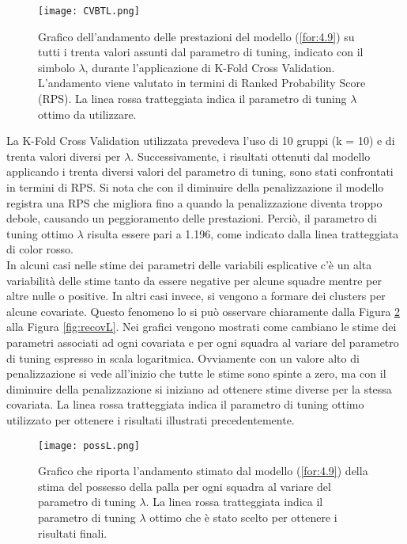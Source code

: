 \begin{figure}[htbp]
	\begin{center}
		\texttt{[image: CVBTL.png]}
		\caption{Grafico dell'andamento delle prestazioni del modello (\ref{for:4.9}) su tutti i trenta valori assunti dal parametro di tuning, indicato con il simbolo $\lambda$, durante l'applicazione di K-Fold Cross Validation. L'andamento viene valutato in termini di Ranked Probability Score (RPS). La linea rossa tratteggiata indica il parametro di tuning $\lambda$ ottimo da utilizzare.} \label{fig:lambda1}
	\end{center}
\end{figure}
La K-Fold Cross Validation utilizzata prevedeva l'uso di 10 gruppi (k = 10) e di trenta valori diversi per $\lambda$. Successivamente, i risultati ottenuti dal modello applicando i trenta diversi valori del parametro di tuning, sono stati confrontati in termini di RPS. Si nota che con il diminuire della penalizzazione il modello registra una RPS che migliora fino a quando la penalizzazione diventa troppo debole, causando un peggioramento delle prestazioni. Perciò, il parametro di tuning ottimo $\lambda$ risulta essere pari a 1.196, come indicato dalla linea tratteggiata di color rosso.\\
In alcuni casi nelle stime dei parametri delle variabili esplicative c'è un alta variabilità delle stime tanto da essere negative per alcune squadre mentre per altre nulle o positive. In altri casi invece, si vengono a formare dei clusters per alcune covariate. Questo fenomeno lo si può osservare chiaramente dalla Figura \ref{fig:possL} alla Figura \ref{fig:recovL}. Nei grafici vengono mostrati come cambiano le stime dei parametri associati ad ogni covariata e per ogni squadra al variare del parametro di tuning espresso in scala logaritmica. Ovviamente con un valore alto di penalizzazione si vede all'inizio che tutte le stime sono spinte a zero, ma con il diminuire della penalizzazione si iniziano ad ottenere stime diverse per la stessa covariata. La linea rossa tratteggiata indica il parametro di tuning ottimo utilizzato per ottenere i risultati illustrati precedentemente.
\begin{figure}[htbp]
	\begin{center}
		\texttt{[image: possL.png]}
		\caption{Grafico che riporta l'andamento stimato dal modello (\ref{for:4.9}) della stima del possesso della palla per ogni squadra al variare del parametro di tuning $\lambda$. La linea rossa tratteggiata indica il parametro di tuning $\lambda$ ottimo che è stato scelto per ottenere i risultati finali.} \label{fig:possL}
	\end{center}
\end{figure}

